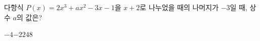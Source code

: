 다항식 $P(x)=2x^3+ax^2-3x-1$을 $x+2$로 나누었을 때의 나머지가 $-3$일 때, 상수 $a$의 값은?
\begin{choices32}{$-4$}{$-2$}{$2$}{$4$}{$8$}\end{choices32}
